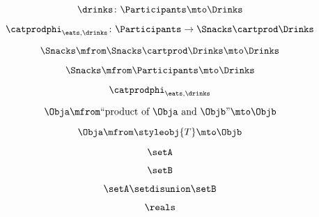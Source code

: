 \begin{forslides}
    \begin{equation}
        \label{eq:feedback-053}
        \drinks\colon \Participants \mto \Drinks
    \end{equation}

    \begin{equation}
        \label{eq:feedback-054}
        \catprodphi_{\eats,\drinks} \colon \Participants \to \Snacks \cartprod \Drinks
    \end{equation}

    \begin{equation}
        \label{eq:feedback-055}
        \Snacks \mfrom \Snacks \cartprod \Drinks \mto \Drinks
    \end{equation}

    \begin{equation}
        \label{eq:feedback-056}
        \Snacks \mfrom  \Participants \mto \Drinks
    \end{equation}

    \begin{equation}
        \label{eq:feedback-057}
        \catprodphi_{\eats,\drinks}
    \end{equation}

    \begin{equation}
        \label{eq:feedback-058}
        \Obja \mfrom \text{``product of } \Obja \text{ and } \Objb \text{''}  \mto \Objb
    \end{equation}

    \begin{equation}
        \label{eq:feedback-059}
        \Obja \mfrom \styleobj{T} \mto \Objb
    \end{equation}

    \begin{equation}
        \label{eq:feedback-060}
        \setA
    \end{equation}

    \begin{equation}
        \label{eq:feedback-061}
        \setB
    \end{equation}

    \begin{equation}
        \label{eq:feedback-062}
        \setA \setdisunion \setB
    \end{equation}

    \begin{equation}
        \label{eq:feedback-063}
        \reals
    \end{equation}


\end{forslides}

